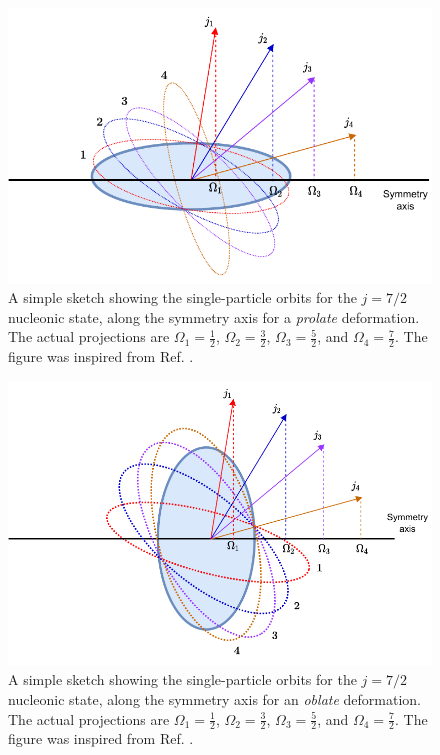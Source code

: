 \begin{figure}
    \centering
    \includegraphics[scale=1]{Chapters/Figures/nillson_SP_orbits.pdf}
    \caption{A simple sketch showing the single-particle orbits for the $j=7/2$ nucleonic state, along the symmetry axis for a \emph{prolate} deformation. The actual projections are $\Omega_1=\frac{1}{2}$, $\Omega_2=\frac{3}{2}$, $\Omega_3=\frac{5}{2}$, and $\Omega_4=\frac{7}{2}$. The figure was inspired from Ref. \cite{krane1991introductory}.}
    \label{nillson-orbits-prolate-projections}
\end{figure}

\begin{figure}
    \centering
    \includegraphics[scale=1]{Chapters/Figures/nillson_SP_orbits_2.pdf}
    \caption{A simple sketch showing the single-particle orbits for the $j=7/2$ nucleonic state, along the symmetry axis for an \emph{oblate} deformation. The actual projections are $\Omega_1=\frac{1}{2}$, $\Omega_2=\frac{3}{2}$, $\Omega_3=\frac{5}{2}$, and $\Omega_4=\frac{7}{2}$. The figure was inspired from Ref. \cite{krane1991introductory}.}
    \label{nillson-orbits-oblate-projections}
\end{figure}

